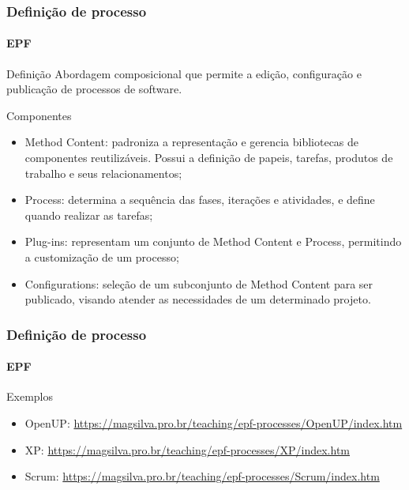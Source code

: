 \begin{frame}
	\frametitle{Definição de processo}
	\framesubtitle{EPF}
	
	
	\begin{block:concept}{Definição}
		Abordagem composicional que permite a edição, configuração e publicação de processos
		de software.
	\end{block:concept}
	
	\begin{block:fact}{Componentes}
		\begin{itemize}
			\item Method Content: padroniza a representação e gerencia bibliotecas de componentes
			reutilizáveis. Possui a definição de papeis, tarefas, produtos de trabalho e seus
			relacionamentos;
			
			\item Process: determina a sequência das fases, iterações e atividades, e define
			quando realizar as tarefas;
			
			\item Plug-ins: representam um conjunto de Method Content e Process, permitindo a
			customização de um processo;
			
			\item Configurations: seleção de um subconjunto de Method Content para ser
			publicado, visando atender as necessidades de um determinado projeto.
		\end{itemize}
	\end{block:fact}
\end{frame}


\begin{frame}
	\frametitle{Definição de processo}
	\framesubtitle{EPF}
	
	\begin{block:fact}{Exemplos}
		\begin{itemize}
			\item OpenUP: \url{https://magsilva.pro.br/teaching/epf-processes/OpenUP/index.htm}
			\item XP: \url{https://magsilva.pro.br/teaching/epf-processes/XP/index.htm}
			\item Scrum: \url{https://magsilva.pro.br/teaching/epf-processes/Scrum/index.htm}
		\end{itemize}
	\end{block:fact}
\end{frame}


